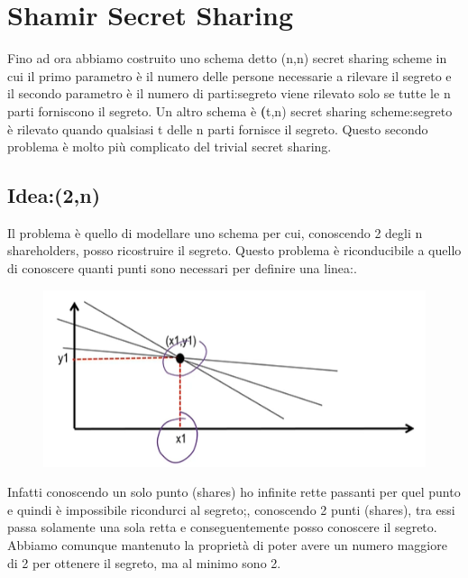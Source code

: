 \documentclass{book}
\begin{document}
\section{Shamir Secret Sharing}
Fino ad ora abbiamo costruito uno schema detto (n,n) secret sharing scheme in cui il primo parametro è il numero delle persone necessarie a rilevare il segreto e il secondo parametro è il numero di parti:\@il segreto viene rilevato solo se tutte le n parti forniscono il segreto\@.\newline
Un altro schema è \textbf(t,n) secret sharing scheme:\@il segreto è rilevato quando qualsiasi t delle n parti fornisce il segreto\@. Questo secondo problema è molto più complicato del trivial secret sharing\@.
\subsection{Idea:\@Schema (2,n)}
Il problema è quello di modellare uno schema per cui, conoscendo 2 degli n shareholders, posso ricostruire il segreto\@. Questo problema è riconducibile a quello di conoscere quanti punti sono necessari per definire una linea:\@.
\begin{figure}[h]
	\centering
	\includegraphics[scale=0.5]{2021-12-26-18-33-00.png}%
\end{figure}
Infatti conoscendo un solo punto (shares) ho infinite rette passanti per quel punto e quindi è impossibile ricondurci al segreto;\@tuttavia, conoscendo 2 punti (shares), tra essi passa solamente una sola retta e conseguentemente posso conoscere il segreto\@. Abbiamo comunque mantenuto la proprietà di poter avere un numero maggiore di 2 per ottenere il segreto, ma al minimo sono 2\@.
\end{document}
